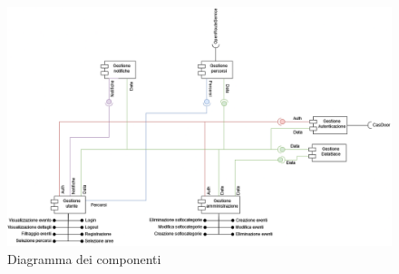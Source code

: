 \documentclass{article}
\begin{document}
\begin{figure}[htbp]
    \centering
    \includegraphics[width=1\textwidth]{Images/ComponentDiagram.png}
    \caption{Diagramma dei componenti}
    \label{fig:component-diagram}
\end{figure}
\end{document}
